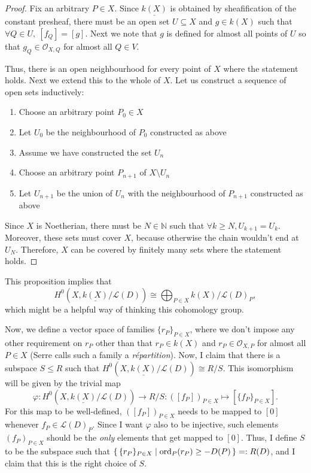 \begin{proof}
  Fix an arbitrary $P\in X$. Since $\underline{k(X)}$ is obtained by
  sheafification of the constant presheaf, there must be an open
  set $U\subseteq X$ and $g\in k(X)$ such that
  $\forall Q\in U,\ [f_{Q}]=[g]$. Next we note that $g$
  is defined for almost all points of $U$ so that $g_{Q}
  \in\mathscr{O}_{X,Q}$ for almost all $Q\in V$.

  Thus, there is an open neighbourhood for every point
  of $X$ where the statement holds. Next we extend this to the whole of $X$.
  Let us construct a sequence of open sets inductively:
  \begin{enumerate}
    \item Choose an arbitrary point $P_{0}\in X$
    \item Let $U_{0}$ be the neighbourhood of $P_{0}$ constructed as above
    \item Assume we have constructed the set $U_{n}$
    \item Choose an arbitrary point $P_{n+1}$ of $X\setminus U_{n}$
    \item Let $U_{n+1}$ be the union of $U_{n}$ with the
          neighbourhood of $P_{n+1}$ constructed as above
  \end{enumerate}
  Since $X$ is Noetherian, there must be $N\in\mathbb{N}$
  such that $\forall k\geq N, U_{k+1}=U_{k}$. Moreover, these sets must
  cover $X$, because otherwise the chain wouldn't end at $U_{N}$.
  Therefore, $X$ can be covered by finitely many sets where the statement
  holds.
\end{proof}
\begin{rem}
  This proposition implies that
  \[
    H^{0}(X,\underline{k(X)}/\mathcal{L}(D))\cong \bigoplus_{P\in X}
    k(X)/\mathcal{L}(D)_{P},
  \]
  which might be a helpful way of thinking this cohomology group.
\end{rem}
Now, we define a vector space of families $\{r_{P}\}_{P\in X}$, where we don't
impose any other requirement on $r_{P}$ other than that $r_{P}\in k(X)$ and
$r_{P}\in\mathscr{O}_{X,P}$ for almost all $P\in X$ (Serre calls such a
family a \emph{r\'epartition}).
Now, I claim that there is a subspace
$S\leq R$ such that $H^{0}(X,\underline{k(X)}/\mathcal{L}(D))\cong R/S$.
This isomorphism will be given by the trivial map
\[
  \varphi: H^{0}(X,\underline{k(X)}/\mathcal{L}(D))\to R/S
  :([f_{P}])_{P\in X}\mapsto [\{f_{P}\}_{P\in X}].
\]
For this map to be well-defined, $([f_{P}])_{P\in X}$ needs to be
mapped to $[0]$ whenever $f_{P}\in\mathcal{L}(D)_{P}$. Since I want
$\varphi$ also to be injective, such elements $(f_{P})_{P\in X}$ should be
the \emph{only} elements that get mapped to $[0]$. Thus, I define $S$
to be the subspace such that $\set{\{r_{P}\}_{P\in X}\mid \operatorname{ord}_{P}(r_{P})
  \geq -D(P)}=:R(D)$, and I claim that this is the right choice of $S$.

